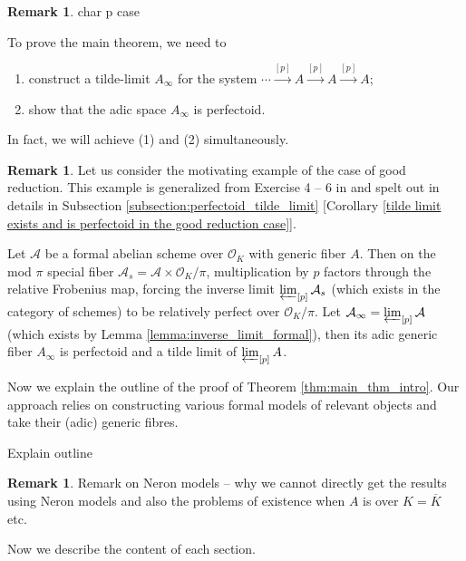 \documentclass[10pt,oneside]{amsart}
\theoremstyle{definition}
\newtheorem{remark*}[mainthm]{Remark}
\begin{document}
\begin{remark*}	 
{\color{red}  char p case }
\end{remark*}

 To prove the main theorem,  we need to 
\begin{enumerate}
\item construct a tilde-limit $A_\infty$ for the system $ \cdots \xrightarrow{[p]} A \xrightarrow{[p]} A \xrightarrow{[p]} A $;
\item show that the adic space $A_\infty$ is perfectoid. 
\end{enumerate}
In fact, we will achieve (1) and (2) simultaneously. 

\begin{remark*}	\label{remark:good_reduction}
Let us consider the motivating example of the case of good reduction. This example is generalized from Exercise 4 -- 6 in \cite{Bhatt} and spelt out in details in Subsection \ref{subsection:perfectoid_tilde_limit} [Corollary \ref{tilde limit exists and is perfectoid in the good reduction case}]. 

Let $\mathcal A$ be a formal abelian scheme over $\mathcal O_K$ with generic fiber $A$. Then on the mod $\pi$ special fiber $\mathcal A_s = \mathcal A \times \mathcal O_K/\pi$,  multiplication by $p$ factors through the relative Frobenius map, forcing the inverse limit $ \varprojlim_{[p]} \mathcal A_s $ (which exists in the category of schemes) to be relatively perfect over $\mathcal O_K/\pi$. Let $\mathcal A_{\infty} = \varprojlim_{[p]} \mathcal A$ (which exists by Lemma \ref{lemma:inverse_limit_formal}), then its adic generic fiber $A_\infty$ is perfectoid and a tilde limit of $\varprojlim_{[p]}A$.
\end{remark*}

Now we explain the outline of the proof of Theorem \ref{thm:main_thm_intro}. Our approach relies on constructing various formal models of relevant objects and take their (adic) generic fibres. 

{\color{red} Explain outline}

\begin{remark*}	
{\color{red} Remark on Neron models -- why we cannot directly get the results using Neron models and also the problems of existence when $A$ is over $K = \overline K$ etc. }
\end{remark*}

\vspace*{0.2cm}


 
Now we describe the content of each section. 
\end{document}
